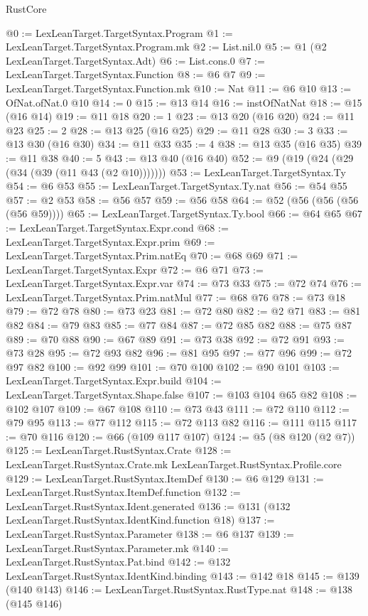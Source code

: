 \begin{lexlean}{RustCore}
\begin{coremodule}
@0 := LexLeanTarget.TargetSyntax.Program
@1 := LexLeanTarget.TargetSyntax.Program.mk
@2 := List.nil.{0}
@5 := @1 (@2 LexLeanTarget.TargetSyntax.Adt)
@6 := List.cons.{0}
@7 := LexLeanTarget.TargetSyntax.Function
@8 := @6 @7
@9 := LexLeanTarget.TargetSyntax.Function.mk
@10 := Nat
@11 := @6 @10
@13 := OfNat.ofNat.{0} @10
@14 := 0
@15 := @13 @14
@16 := instOfNatNat
@18 := @15 (@16 @14)
@19 := @11 @18
@20 := 1
@23 := @13 @20 (@16 @20)
@24 := @11 @23
@25 := 2
@28 := @13 @25 (@16 @25)
@29 := @11 @28
@30 := 3
@33 := @13 @30 (@16 @30)
@34 := @11 @33
@35 := 4
@38 := @13 @35 (@16 @35)
@39 := @11 @38
@40 := 5
@43 := @13 @40 (@16 @40)
@52 := @9 (@19 (@24 (@29 (@34 (@39 (@11 @43 (@2 @10)))))))
@53 := LexLeanTarget.TargetSyntax.Ty
@54 := @6 @53
@55 := LexLeanTarget.TargetSyntax.Ty.nat
@56 := @54 @55
@57 := @2 @53
@58 := @56 @57
@59 := @56 @58
@64 := @52 (@56 (@56 (@56 (@56 @59))))
@65 := LexLeanTarget.TargetSyntax.Ty.bool
@66 := @64 @65
@67 := LexLeanTarget.TargetSyntax.Expr.cond
@68 := LexLeanTarget.TargetSyntax.Expr.prim
@69 := LexLeanTarget.TargetSyntax.Prim.natEq
@70 := @68 @69
@71 := LexLeanTarget.TargetSyntax.Expr
@72 := @6 @71
@73 := LexLeanTarget.TargetSyntax.Expr.var
@74 := @73 @33
@75 := @72 @74
@76 := LexLeanTarget.TargetSyntax.Prim.natMul
@77 := @68 @76
@78 := @73 @18
@79 := @72 @78
@80 := @73 @23
@81 := @72 @80
@82 := @2 @71
@83 := @81 @82
@84 := @79 @83
@85 := @77 @84
@87 := @72 @85 @82
@88 := @75 @87
@89 := @70 @88
@90 := @67 @89
@91 := @73 @38
@92 := @72 @91
@93 := @73 @28
@95 := @72 @93 @82
@96 := @81 @95
@97 := @77 @96
@99 := @72 @97 @82
@100 := @92 @99
@101 := @70 @100
@102 := @90 @101
@103 := LexLeanTarget.TargetSyntax.Expr.build
@104 := LexLeanTarget.TargetSyntax.Shape.false
@107 := @103 @104 @65 @82
@108 := @102 @107
@109 := @67 @108
@110 := @73 @43
@111 := @72 @110
@112 := @79 @95
@113 := @77 @112
@115 := @72 @113 @82
@116 := @111 @115
@117 := @70 @116
@120 := @66 (@109 @117 @107)
@124 := @5 (@8 @120 (@2 @7))
@125 := LexLeanTarget.RustSyntax.Crate
@128 := LexLeanTarget.RustSyntax.Crate.mk LexLeanTarget.RustSyntax.Profile.core
@129 := LexLeanTarget.RustSyntax.ItemDef
@130 := @6 @129
@131 := LexLeanTarget.RustSyntax.ItemDef.function
@132 := LexLeanTarget.RustSyntax.Ident.generated
@136 := @131 (@132 LexLeanTarget.RustSyntax.IdentKind.function @18)
@137 := LexLeanTarget.RustSyntax.Parameter
@138 := @6 @137
@139 := LexLeanTarget.RustSyntax.Parameter.mk
@140 := LexLeanTarget.RustSyntax.Pat.bind
@142 := @132 LexLeanTarget.RustSyntax.IdentKind.binding
@143 := @142 @18
@145 := @139 (@140 @143)
@146 := LexLeanTarget.RustSyntax.RustType.nat
@148 := @138 (@145 @146)

\end{coremodule}
\end{lexlean}
